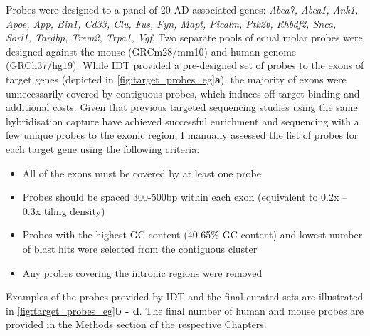 
Probes were designed to a panel of 20 AD-associated genes: \textit{Abca7, Abca1, Ank1, Apoe, App, Bin1, Cd33, Clu, Fus, Fyn, Mapt, Picalm, Ptk2b, Rhbdf2, Snca, Sorl1, Tardbp, Trem2, Trpa1, Vgf}. Two separate pools of equal molar probes were designed against the mouse (GRCm28/mm10) and human genome (GRCh37/hg19). While IDT provided a pre-designed set of probes to the exons of target genes (depicted in \cref{fig:target_probes_eg}\textbf{a}), the majority of exons were unnecessarily covered by contiguous probes, which induces off-target binding and additional costs. Given that previous targeted sequencing studies using the same hybridisation capture have achieved successful enrichment and sequencing with a few unique probes to the exonic region\cite{Sheynkman2020}, I manually assessed the list of probes for each target gene using the following criteria:
\begin{itemize}
	\item All of the exons must be covered by at least one probe
	\item Probes should be spaced 300-500bp within each exon (equivalent to 0.2x – 0.3x tiling density) 
	\item Probes with the highest GC content (40-65\% GC content) and lowest number of blast hits were selected from the contiguous cluster 
	\item Any probes covering the intronic regions were removed
\end{itemize}
Examples of the probes provided by IDT and the final curated sets are illustrated in  \cref{fig:target_probes_eg}\textbf{b - d}. The final number of human and mouse probes are provided in the Methods section of the respective Chapters.


